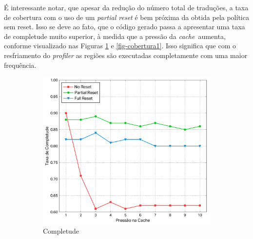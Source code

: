 \documentclass[12pt,twoside]{article}
\newcommand{\cache}{\emph{cache}}
\begin{document}
É interessante notar, que apesar da redução do número total de traduções, a taxa de cobertura com o uso de um \emph{partial reset} é bem próxima da obtida pela política sem reset. Isso se deve ao fato, que o código gerado passa a apresentar uma taxa de completude muito superior, à medida que a pressão da \cache~aumenta, conforme visualizado nas Figuras \ref{fig-completude1} e  \ref{fig-cobertura1}. Isso significa que com o resfriamento do \emph{profiler} as regiões são executadas completamente com uma maior frequência.

\begin{figure}[!ht]
        \centering
        \begin{subfigure}[b]{0.45\textwidth}
                \includegraphics[width=\textwidth]{./figs/reset-completion-ratio}
                \caption{Completude}
                \label{fig-completude1}
        \end{subfigure}
        \quad %
                \begin{subfigure}[b]{0.45\textwidth}

\end{subfigure}
\end{figure}
\end{document}

